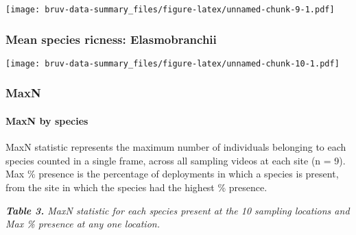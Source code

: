 \documentclass[]{article}
\let\oldparagraph\paragraph
\renewcommand{\paragraph}[1]{\oldparagraph{#1}\mbox{}}
\begin{document}
\texttt{[image: bruv-data-summary\_files/figure-latex/unnamed-chunk-9-1.pdf]}

\subsubsection{Mean species ricness:
Elasmobranchii}\label{mean-species-ricness-elasmobranchii}

\texttt{[image: bruv-data-summary\_files/figure-latex/unnamed-chunk-10-1.pdf]}

\subsubsection{MaxN}\label{maxn}

\paragraph{MaxN by species}\label{maxn-by-species}

MaxN statistic represents the maximum number of individuals belonging to
each species counted in a single frame, across all sampling videos at
each site (n = 9). Max \% presence is the percentage of deployments in
which a species is present, from the site in which the species had the
highest \% presence.

\emph{\textbf{Table 3.} MaxN statistic for each species present at the
10 sampling locations and Max \% presence at any one location. }
\end{document}
